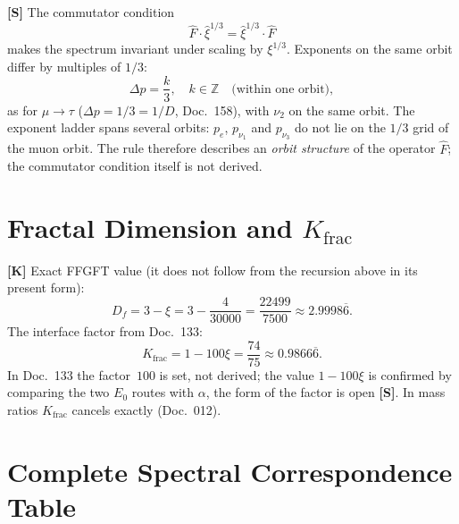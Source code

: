 \textbf{[S]} The commutator condition
\begin{equation}
  \hat{F}\cdot\hat{\xi}^{1/3} = \hat{\xi}^{1/3}\cdot\hat{F}
\end{equation}
makes the spectrum invariant under scaling by $\xi^{1/3}$. Exponents
on the same orbit differ by multiples of $1/3$:
\begin{equation}
  \Delta p = \frac{k}{3},\quad k\in\mathbb{Z}\quad\text{(within one orbit)},
\end{equation}
as for $\mu \to \tau$ ($\Delta p = 1/3 = 1/D$, Doc.~158), with $\nu_2$ on
the same orbit. The exponent ladder spans several orbits: $p_e$,
$p_{\nu_1}$ and $p_{\nu_3}$ do not lie on the $1/3$ grid of the muon
orbit. The rule therefore describes an \emph{orbit structure} of the
operator $\hat{F}$; the commutator condition itself is not derived.

\section{Fractal Dimension and $K_{\mathrm{frac}}$}

\textbf{[K]} Exact FFGFT value (it does not follow from the recursion above in its present form):
\begin{equation}
  \boxed{D_f = 3 - \xi = 3 - \frac{4}{30000}
  = \frac{22499}{7500} \approx 2.9998\overline{6}}.
\end{equation}
The interface factor from Doc.~133:
\begin{equation}
  K_{\mathrm{frac}} = 1 - 100\xi = \frac{74}{75} \approx 0.9866\overline{6}.
\end{equation}
In Doc.~133 the factor~$100$ is set, not derived; the value $1-100\xi$ is
confirmed by comparing the two $E_0$ routes with $\alpha$, the form of the
factor is open \textbf{[S]}.
In mass ratios $K_{\mathrm{frac}}$ cancels exactly (Doc.~012).

\section{Complete Spectral Correspondence Table}

